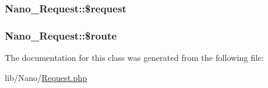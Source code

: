 \hypertarget{classNano__Request_e9023d764e866d707d2007697bc4e396}{
\subsubsection[{\$request}]{\setlength{\rightskip}{0pt plus 5cm}Nano\_\-Request::\$request}}
\label{classNano__Request_e9023d764e866d707d2007697bc4e396}


\hypertarget{classNano__Request_097c3ef2f417cabf53dd1f1d75aa2a65}{
\subsubsection[{\$route}]{\setlength{\rightskip}{0pt plus 5cm}Nano\_\-Request::\$route}}
\label{classNano__Request_097c3ef2f417cabf53dd1f1d75aa2a65}




The documentation for this class was generated from the following file:\begin{CompactItemize}
\item 
lib/Nano/\hyperlink{Request_8php}{Request.php}\end{CompactItemize}
